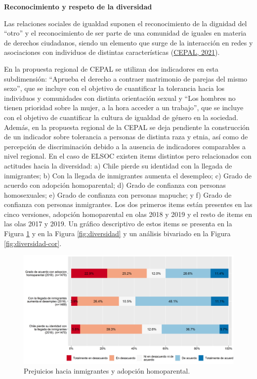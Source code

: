 \documentclass[
  12pt,
]{book}
\begin{document}
\textbf{Reconocimiento y respeto de la diversidad}

Las relaciones sociales de igualdad suponen el reconocimiento de la dignidad del ``otro'' y el reconocimiento de ser parte de una comunidad de iguales en materia de derechos ciudadanos, siendo un elemento que surge de la interacción en redes y asociaciones con individuos de distintas características (\protect\hyperlink{ref-cepal_cohesion_2021}{CEPAL, 2021}).

En la propuesta regional de CEPAL se utilizan dos indicadores en esta subdimensión: ``Aprueba el derecho a contraer matrimonio de parejas del mismo sexo'', que se incluye con el objetivo de cuantificar la tolerancia hacia los individuos y comunidades con distinta orientación sexual y ``Los hombres no tienen prioridad sobre la mujer, a la hora acceder a un trabajo'', que se incluye con el objetivo de cuantificar la cultura de igualdad de género en la sociedad. Además, en la propuesta regional de la CEPAL se deja pendiente la construcción de un indicador sobre tolerancia a personas de distinta raza y etnia, así como de percepción de discriminación debido a la ausencia de indicadores comparables a nivel regional. En el caso de ELSOC existen items distintos pero relacionados con actitudes hacia la diversidad: a) Chile pierde su identidad con la llegada de inmigrantes; b) Con la llegada de inmigrantes aumenta el desempleo; c) Grado de acuerdo con adopción homoparental; d) Grado de confianza con personas homosexuales; e) Grado de confianza con personas mapuche; y f) Grado de confianza con personas inmigrantes. Los dos primeros items están presentes en las cinco versiones, adopción homoparental en olas 2018 y 2019 y el resto de items en las olas 2017 y 2019. Un gráfico descriptivo de estos items se presenta en la Figura \ref{fig:prejuicios} y en la Figura \ref{fig:diversidad} y un análisis bivariado en la Figura \ref{fig:diversidad-cor}.

\begin{figure}[H]

{\centering \includegraphics[width=1\linewidth,height=1\textheight]{output/graphs/prejuicios} 

}

\caption{Prejuicios hacia inmigrantes y adopción homoparental.}\label{fig:prejuicios}
\end{figure}
\end{document}
